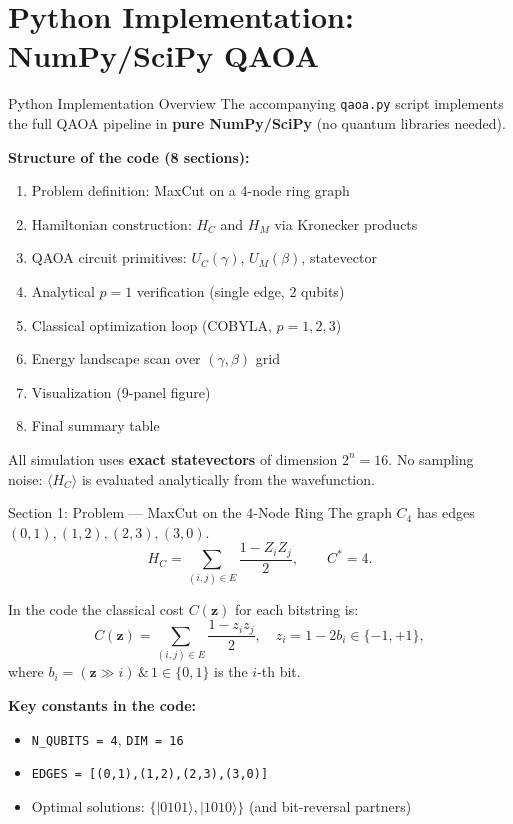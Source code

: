 \documentclass{beamer}
\begin{document}


\section{Python Implementation: NumPy/SciPy QAOA}

\begin{frame}{Python Implementation Overview}
The accompanying \texttt{qaoa.py} script implements the full QAOA
pipeline in \textbf{pure NumPy/SciPy} (no quantum libraries needed).

\medskip

\textbf{Structure of the code (8 sections):}
\begin{enumerate}
  \item Problem definition: MaxCut on a 4-node ring graph
  \item Hamiltonian construction: $H_C$ and $H_M$ via Kronecker products
  \item QAOA circuit primitives: $U_C(\gamma)$, $U_M(\beta)$, statevector
  \item Analytical $p=1$ verification (single edge, 2 qubits)
  \item Classical optimization loop (COBYLA, $p=1,2,3$)
  \item Energy landscape scan over $(\gamma,\beta)$ grid
  \item Visualization (9-panel figure)
  \item Final summary table
\end{enumerate}

\medskip

All simulation uses \textbf{exact statevectors} of dimension $2^n = 16$.
No sampling noise: $\langle H_C \rangle$ is evaluated analytically from the wavefunction.
\end{frame}


\begin{frame}[fragile]{Section 1: Problem — MaxCut on the 4-Node Ring}
The graph $C_4$ has edges $(0,1),(1,2),(2,3),(3,0)$.
\[
  H_C = \sum_{(i,j)\in E}\frac{1 - Z_i Z_j}{2}, \qquad C^* = 4.
\]

In the code the classical cost $C(\mathbf{z})$ for each bitstring is:
\begin{equation}
  C(\mathbf{z}) = \sum_{(i,j)\in E} \frac{1 - z_i z_j}{2},
  \quad z_i = 1 - 2b_i \in \{-1,+1\},
\end{equation}
where $b_i = (\mathbf{z} \gg i)\,\&\,1 \in \{0,1\}$ is the $i$-th bit.

\medskip

\textbf{Key constants in the code:}
\begin{itemize}
  \item \texttt{N\_QUBITS = 4}, \texttt{DIM = 16}
  \item \texttt{EDGES = [(0,1),(1,2),(2,3),(3,0)]}
  \item Optimal solutions: $\{|0101\rangle, |1010\rangle\}$ (and bit-reversal partners)
\end{itemize}
\end{frame}
\end{document}

